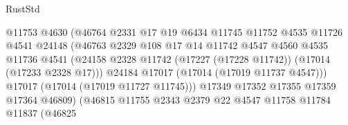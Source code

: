\begin{lexlean}{RustStd}
\begin{coremodule}
                                          @11753
                                          @4630
                                          (@46764
                                            @2331
                                            @17
                                            @19
                                            @6434
                                            @11745
                                            @11752
                                            @4535
                                            @11726
                                            @4541
                                            @24148
                                            (@46763
                                              @2329
                                              @108
                                              @17
                                              @14
                                              @11742
                                              @4547
                                              @4560
                                              @4535
                                              @11736
                                              @4541
                                              (@24158
                                                @2328
                                                @11742
                                                (@17227 (@17228 @11742))
                                                (@17014 (@17233 @2328 @17)))
                                              @24184
                                              @17017
                                              (@17014 (@17019 @11737 @4547)))
                                            @17017
                                            (@17014 (@17019 @11727 @11745)))
                                          @17349
                                          @17352
                                          @17355
                                          @17359
                                          @17364
                                          @46809)
                                        (@46815
                                          @11755
                                          @2343
                                          @2379
                                          @22
                                          @4547
                                          @11758
                                          @11784
                                          @11837
                                          (@46825

\end{coremodule}
\end{lexlean}
